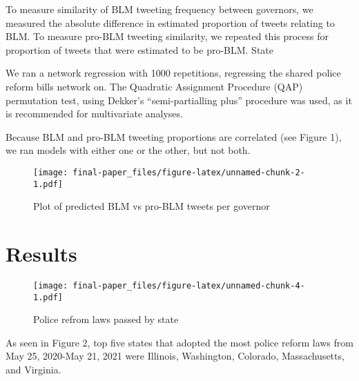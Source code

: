 \documentclass[12pt]{article}
\begin{document}
To measure similarity of BLM tweeting frequency between governors, we
measured the absolute difference in estimated proportion of tweets
relating to BLM. To measure pro-BLM tweeting similarity, we repeated
this process for proportion of tweets that were estimated to be pro-BLM.
State

We ran a network regression with 1000 repetitions, regressing the shared
police reform bills network on. The Quadratic Assignment Procedure (QAP)
permutation test, using Dekker's ``semi-partialling plus'' procedure was
used, as it is recommended for multivariate analyses.

Because BLM and pro-BLM tweeting proportions are correlated (see Figure
1), we ran models with either one or the other, but not both.

\begin{figure}
\centering
\texttt{[image: final-paper\_files/figure-latex/unnamed-chunk-2-1.pdf]}
\caption{Plot of predicted BLM vs pro-BLM tweets per governor}
\end{figure}

\hypertarget{results}{%
\section{Results}\label{results}}

\begin{figure}
\centering
\texttt{[image: final-paper\_files/figure-latex/unnamed-chunk-4-1.pdf]}
\caption{Police refrom laws passed by state}
\end{figure}

As seen in Figure 2, top five states that adopted the most police reform
laws from May 25, 2020-May 21, 2021 were Illinois, Washington, Colorado,
Massachusetts, and Virginia.
\end{document}
